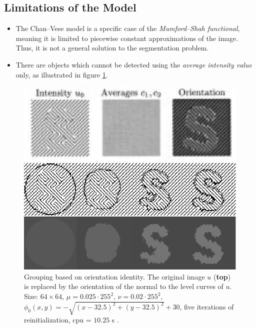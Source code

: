 \documentclass[journal]{IEEEtran}
\begin{document}
\subsection{Limitations of the Model}\label{sec:limitations-of-the-model}
\begin{itemize}
    \item The Chan--Vese model is a specific case of the \emph{Mumford--Shah functional}, meaning it is limited to piecewise constant approximations of the image. Thus, it is not a general solution to the segmentation problem.
    \item There are objects which cannot be detected using the \emph{average intensity value} only, as illustrated in figure \ref{fig:limitations}.
\end{itemize}

\begin{figure}[!t]
    \centering
    \begin{minipage}{0.45\textwidth}
        \centering
        \includegraphics[width=\textwidth]{images/limitations-images.png}
    \end{minipage}
    \hfill
    \begin{minipage}{0.45\textwidth}
        \centering
        \includegraphics[width=\textwidth]{images/limitations.png}
    \end{minipage}
    \caption{Grouping based on orientation identity. The original image $u$ (\textbf{top}) is replaced by the orientation of the normal to the level curves of $u$. Size: $64 \times 64$, $\mu = 0.025 \cdot 255^2$, $\nu = 0.02 \cdot 255^2$, $\phi_0(x, y) = -\sqrt{(x - 32.5)^2 + (y - 32.5)^2} + 30$, five iterations of reinitialization, cpu = $10.25$ s \cite{ChanVese}.}
    \label{fig:limitations}
\end{figure}
\end{document}

